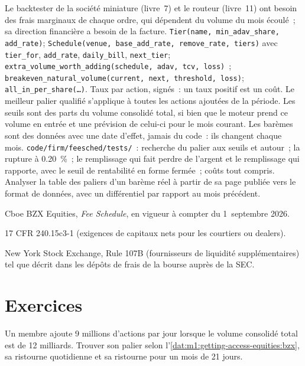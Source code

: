 \begin{build}
 Le backtester de la société miniature (livre~7) et
le routeur (livre~11) ont besoin des frais marginaux de chaque ordre, qui dépendent du
volume du mois écoulé~; sa direction financière a besoin de la facture.
 \texttt{Tier(name, min\_adav\_share, add\_rate)};
\texttt{Schedule(venue, base\_add\_rate, remove\_rate, tiers)} avec
\texttt{tier\_for}, \texttt{add\_rate}, \texttt{daily\_bill}, \texttt{next\_tier}; \texttt{extra\_volume\_worth\_adding(schedule, adav, tcv,
loss)}~; \texttt{breakeven\_natural\_volume(current, next, threshold, loss)};
\texttt{all\_in\_per\_share(\ldots)}.
 Taux par action, signés~: un taux positif est un coût. Le meilleur
palier qualifié s'applique à toutes les actions ajoutées de la période. Les seuils sont des
parts du volume consolidé total, si bien que le moteur prend ce volume en
entrée et une prévision de celui-ci pour le mois courant. Les barèmes sont des données avec une
date d'effet, jamais du code~: ils changent chaque mois.
 \texttt{code/firm/feesched/tests/}~: recherche du palier
aux seuils et autour~; la rupture à 0.20~\%~; le remplissage qui fait perdre de l'argent et le
remplissage qui rapporte, avec le seuil de rentabilité en forme fermée~; coûts tout compris.
 Analyser la table des paliers d'un barème réel à partir de sa
page publiée vers le format de données, avec un différentiel par rapport au mois précédent.
\end{build}

\begin{omsources}
\item Cboe BZX Equities, \emph{Fee Schedule}, en vigueur à compter du 1~septembre 2026.
\item 17 CFR 240.15c3-1 (exigences de capitaux nets pour les courtiers ou dealers).
\item New York Stock Exchange, Rule 107B (fournisseurs de liquidité supplémentaires)
tel que décrit dans les dépôts de frais de la bourse auprès de la SEC.
\end{omsources}

\section{Exercices}

\begin{exercise}[$\star$]\label{exo:m1:getting-access-equities:1}
Un membre ajoute 9 millions d'actions par jour lorsque le volume consolidé total est de 12
milliards. Trouver son palier selon l'\cref{dat:m1:getting-access-equities:bzx}, sa
ristourne quotidienne et sa ristourne pour un mois de 21 jours.
\end{exercise}


